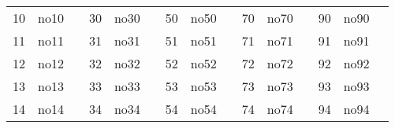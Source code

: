 \documentclass[12pt]{article}
\begin{document}
\begin{table}[]
\begin{tabular}{lllllllllllllll}
\multicolumn{1}{|l|}{10} & 
\multicolumn{1}{l|}{no10}        & 
\multicolumn{1}{l|}{} & 
\multicolumn{1}{l|}{30} & 
\multicolumn{1}{l|}{no30}        & 
\multicolumn{1}{l|}{} & 
\multicolumn{1}{l|}{50} & 
\multicolumn{1}{l|}{no50}        & 
\multicolumn{1}{l|}{} & 
\multicolumn{1}{l|}{70} & 
\multicolumn{1}{l|}{no70}        & 
\multicolumn{1}{l|}{} & 
\multicolumn{1}{l|}{90}  & 
\multicolumn{1}{l|}{no90}        &  \\ \cline{1-2} \cline{4-5} \cline{7-8} \cline{10-11} \cline{13-14}


\multicolumn{1}{|l|}{11} & 
\multicolumn{1}{l|}{no11}        & 
\multicolumn{1}{l|}{} & 
\multicolumn{1}{l|}{31} & 
\multicolumn{1}{l|}{no31}        & 
\multicolumn{1}{l|}{} & 
\multicolumn{1}{l|}{51} & 
\multicolumn{1}{l|}{no51}        & 
\multicolumn{1}{l|}{} & 
\multicolumn{1}{l|}{71} & 
\multicolumn{1}{l|}{no71}        & 
\multicolumn{1}{l|}{} & 
\multicolumn{1}{l|}{91}  & 
\multicolumn{1}{l|}{no91}        &  \\ \cline{1-2} \cline{4-5} \cline{7-8} \cline{10-11} \cline{13-14}



\multicolumn{1}{|l|}{12} & 
\multicolumn{1}{l|}{no12}        & 
\multicolumn{1}{l|}{} & 
\multicolumn{1}{l|}{32} & 
\multicolumn{1}{l|}{no32}        & 
\multicolumn{1}{l|}{} & 
\multicolumn{1}{l|}{52} & 
\multicolumn{1}{l|}{no52}        & 
\multicolumn{1}{l|}{} & 
\multicolumn{1}{l|}{72} & 
\multicolumn{1}{l|}{no72}        & 
\multicolumn{1}{l|}{} & 
\multicolumn{1}{l|}{92}  & 
\multicolumn{1}{l|}{no92}        &  \\ \cline{1-2} \cline{4-5} \cline{7-8} \cline{10-11} \cline{13-14}



\multicolumn{1}{|l|}{13} & 
\multicolumn{1}{l|}{no13}        & 
\multicolumn{1}{l|}{} & 
\multicolumn{1}{l|}{33} & 
\multicolumn{1}{l|}{no33}        & 
\multicolumn{1}{l|}{} & 
\multicolumn{1}{l|}{53} & 
\multicolumn{1}{l|}{no53}        & 
\multicolumn{1}{l|}{} & 
\multicolumn{1}{l|}{73} & 
\multicolumn{1}{l|}{no73}        & 
\multicolumn{1}{l|}{} & 
\multicolumn{1}{l|}{93}  & 
\multicolumn{1}{l|}{no93}        &  \\ \cline{1-2} \cline{4-5} \cline{7-8} \cline{10-11} \cline{13-14}



\multicolumn{1}{|l|}{14} & 
\multicolumn{1}{l|}{no14}        & 
\multicolumn{1}{l|}{} & 
\multicolumn{1}{l|}{34} & 
\multicolumn{1}{l|}{no34}        & 
\multicolumn{1}{l|}{} & 
\multicolumn{1}{l|}{54} & 
\multicolumn{1}{l|}{no54}        & 
\multicolumn{1}{l|}{} & 
\multicolumn{1}{l|}{74} & 
\multicolumn{1}{l|}{no74}        & 
\multicolumn{1}{l|}{} & 
\multicolumn{1}{l|}{94}  & 
\multicolumn{1}{l|}{no94}        &  \\ \cline{1-2} \cline{4-5} \cline{7-8} \cline{10-11} \cline{13-14}




\end{tabular}
\end{table}
\end{document}
